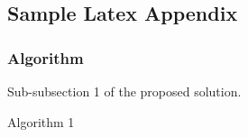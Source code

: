 \documentclass{mscreport}
\begin{document}
\begin{appendices}
\section{Sample Latex Appendix}

\subsubsection{Algorithm}

Sub-subsection 1 of the proposed solution.

\begin{algorithm}
\caption{Algorithm 1}\label{euclid}
\begin{algorithmic}
\Else {}
\EndIf   
\end{algorithmic}
\end{algorithm}

\end{appendices}
\end{document}
